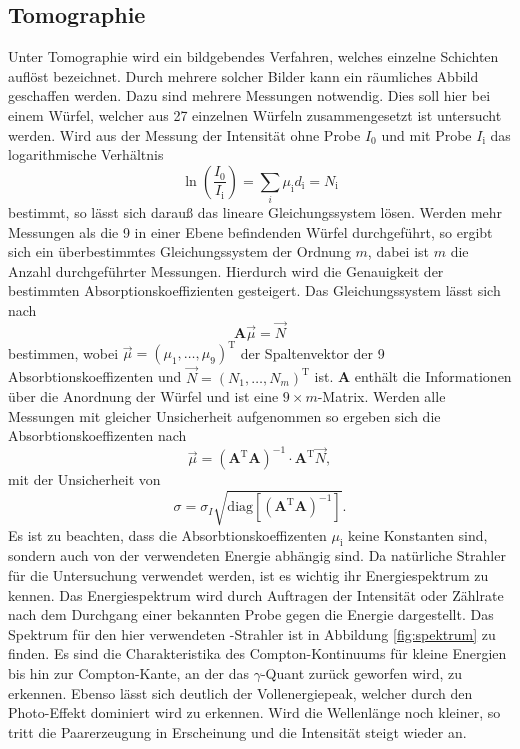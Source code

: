 \subsection{Tomographie}
\label{sec:Tomo}
Unter Tomographie wird ein bildgebendes Verfahren, welches einzelne Schichten auflöst bezeichnet. Durch mehrere solcher Bilder kann ein räumliches 
Abbild geschaffen werden. Dazu sind mehrere Messungen notwendig.
Dies soll hier bei einem Würfel, welcher aus \num{27} einzelnen Würfeln zusammengesetzt ist untersucht werden.
Wird aus der Messung der Intensität ohne Probe $I_0$ und mit Probe $I_\text{i}$ das logarithmische Verhältnis
\begin{equation}
    \label{eqn:Verhältnis}
    \ln\left(\frac{I_0}{I_\text{i}}\right) = \sum_i \mu_\text{i} d_\text{i} = N_\text{i}
\end{equation}
bestimmt, so lässt sich darauß das lineare Gleichungssystem lösen. Werden mehr Messungen als die \num{9} in einer Ebene befindenden Würfel durchgeführt, 
so ergibt sich ein überbestimmtes Gleichungssystem der Ordnung $m$, dabei ist $m$ die Anzahl durchgeführter Messungen.
Hierdurch wird die Genauigkeit der bestimmten Absorptionskoeffizienten gesteigert.
Das Gleichungssystem lässt sich nach
\begin{equation}
    \label{eqn:Gleichungssystem}
    \textbf{A} \vec{\mu} = \vec{N}
\end{equation}
bestimmen, wobei $\vec{\mu} = (\mu_1, \ldots,\mu_9)^\text{T}$ der Spaltenvektor der \num{9} Absorbtionskoeffizenten und $\vec{N} = (N_1, \ldots,N_m)^\text{T}$ ist. 
\textbf{A} enthält die Informationen über die Anordnung der Würfel und ist eine $9 \times m$-Matrix. Werden alle Messungen mit gleicher Unsicherheit 
aufgenommen so ergeben sich die Absorbtionskoeffizenten nach
\begin{equation}
    \label{eqn:Absorbtionskoeffizenten}
    \vec{\mu} = (\textbf{A}^\text{T} \textbf{A})^{-1} \cdot \textbf{A}^\text{T} \vec{N},
\end{equation}
mit der Unsicherheit von
\begin{equation}
    \label{eqn:Unsicherheit}
    \sigma = \sigma_I\sqrt{\text{diag}[(\textbf{A}^\text{T} \textbf{A})^{-1}]}.
\end{equation}
Es ist zu beachten, dass die Absorbtionskoeffizenten $\mu_\text{i}$ keine Konstanten sind, sondern auch von der verwendeten Energie abhängig sind. 
Da natürliche Strahler für die Untersuchung verwendet werden, ist es wichtig ihr Energiespektrum zu kennen. Das Energiespektrum wird durch Auftragen der 
Intensität oder Zählrate nach dem Durchgang einer bekannten Probe gegen die Energie dargestellt. Das Spektrum für den hier verwendeten -Strahler ist in Abbildung \ref{fig:spektrum} zu finden.
Es sind die Charakteristika des Compton-Kontinuums für kleine Energien bis hin zur Compton-Kante, an der das $\gamma$-Quant zurück geworfen wird, zu erkennen. 
Ebenso lässt sich deutlich der Vollenergiepeak, welcher durch den Photo-Effekt dominiert wird zu erkennen. Wird die Wellenlänge noch kleiner, so tritt die Paarerzeugung
in Erscheinung und die Intensität steigt wieder an.

